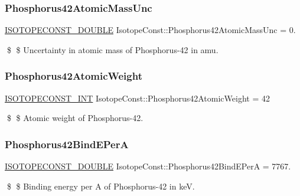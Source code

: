 \subsubsection{\texorpdfstring{Phosphorus42\+Atomic\+Mass\+Unc}{Phosphorus42AtomicMassUnc}}
{\footnotesize\ttfamily \mbox{\hyperlink{group___isotope_const-_macros_ga8f45a7272ce02c0b4c65c44636ed719a}{I\+S\+O\+T\+O\+P\+E\+C\+O\+N\+S\+T\+\_\+\+D\+O\+U\+B\+LE}} Isotope\+Const\+::\+Phosphorus42\+Atomic\+Mass\+Unc = 0.}

\$ \$ Uncertainty in atomic mass of Phosphorus-\/42 in amu. \mbox{\label{group___isotope_const-_phosphorus-_p42_ga60b61057363febfeaec28db82d20cdb0}} 
\subsubsection{\texorpdfstring{Phosphorus42\+Atomic\+Weight}{Phosphorus42AtomicWeight}}
{\footnotesize\ttfamily \mbox{\hyperlink{group___isotope_const-_macros_ga5f18360b3e99483a35c32d789e62621c}{I\+S\+O\+T\+O\+P\+E\+C\+O\+N\+S\+T\+\_\+\+I\+NT}} Isotope\+Const\+::\+Phosphorus42\+Atomic\+Weight = 42}

\$ \$ Atomic weight of Phosphorus-\/42. \mbox{\label{group___isotope_const-_phosphorus-_p42_gabd768bea0dc038b095c3befe64fe9a61}} 
\subsubsection{\texorpdfstring{Phosphorus42\+Bind\+E\+PerA}{Phosphorus42BindEPerA}}
{\footnotesize\ttfamily \mbox{\hyperlink{group___isotope_const-_macros_ga8f45a7272ce02c0b4c65c44636ed719a}{I\+S\+O\+T\+O\+P\+E\+C\+O\+N\+S\+T\+\_\+\+D\+O\+U\+B\+LE}} Isotope\+Const\+::\+Phosphorus42\+Bind\+E\+PerA = 7767.}

\$ \$ Binding energy per A of Phosphorus-\/42 in keV. \mbox{\label{group___isotope_const-_phosphorus-_p42_ga8cc1dcb79cdb28c2fc63c7eb8a61185d}} 
